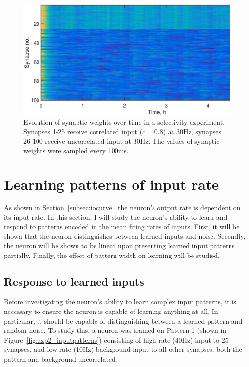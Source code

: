 \documentclass[a4paper,12pt]{report}
\theoremstyle{definition}
\begin{document}
\begin{figure}[h]
    \includegraphics[width=\textwidth]{figures/valid_selectivity_correlation.eps}
    \caption{Evolution of synaptic weights over time in a selectivity experiment. Synapses 1-25 receive correlated input ($c=0.8$) at 30Hz, synapses 26-100 receive uncorrelated input at 30Hz. The values of synaptic weights were sampled every 100ms.}
    \label{fig:selectivity_correlation}
\end{figure}









\section{Learning patterns of input rate}

As shown in Section~\ref{subsec:iocurve}, the neuron's output rate is dependent on its input rate. In this section, I will study the neuron's ability to learn and respond to patterns encoded in the mean firing rates of inputs. First, it will be shown that the neuron distinguishes between learned inputs and noise. Secondly, the neuron will be shown to be linear upon presenting learned input patterns partially. Finally, the effect of pattern width on learning will be studied.

\subsection{Response to learned inputs}
\label{subsec:learnedinputs}


Before investigating the neuron's ability to learn complex input patterns, it is necessary to ensure the neuron is capable of learning anything at all. In particular, it should be capable of distinguishing between a learned pattern and random noise. To study this, a neuron was trained on Pattern 1 (shown in Figure~\ref{fig:exp2_inputpatterns}) consisting of high-rate (40Hz) input to 25 synapses, and low-rate (10Hz) background input to all other synapses, both the pattern and background uncorrelated.
\end{document}
